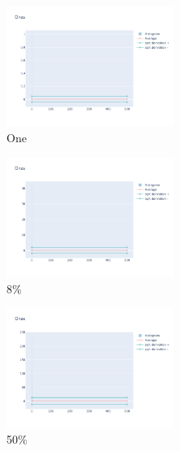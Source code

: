 \documentclass[12pt, fleqn]{report}                             %
\theoremstyle{break}                                            %
\begin{document}
      \begin{figure}[ht!]
        \centering
        \begin{subfigure}[b]{0.4\linewidth}
          \includegraphics[width=0.6\textwidth]{Images/136/dia-a.png}
          \caption{One}
        \end{subfigure}
        \begin{subfigure}[b]{0.4\linewidth}
          \includegraphics[width=0.6\textwidth]{Images/136/dia-b.png}
          \caption{8\%}
        \end{subfigure}
        \begin{subfigure}[b]{0.4\linewidth}
          \includegraphics[width=0.6\textwidth]{Images/136/dia-c.png}
          \caption{50\%}
        \end{subfigure}
        \begin{subfigure}[b]{0.4\linewidth}

\end{subfigure}
\end{figure}
\end{document}
